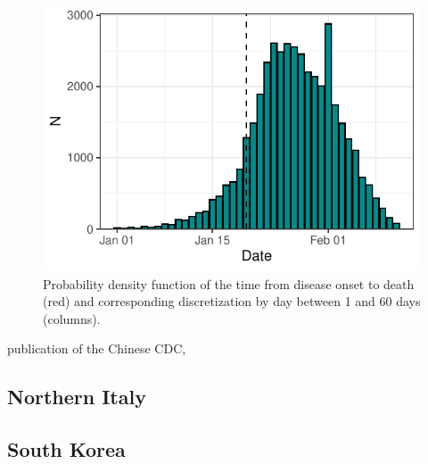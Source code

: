 \documentclass{article}
\begin{document}
	\begin{figure}[b]
		\centering
		\includegraphics{../format_output/figures/china_case_incidence.pdf}
		\caption{Probability density function of the time from disease onset to death (red) and corresponding discretization by day between 1 and 60 days (columns).}
		\label{fig:china_case_incidence.pdf}
	\end{figure}
	
	 publication of the Chinese CDC, 
	
	
	
	\subsection{Northern Italy}
	
	\subsection{South Korea}
	
\end{document}
